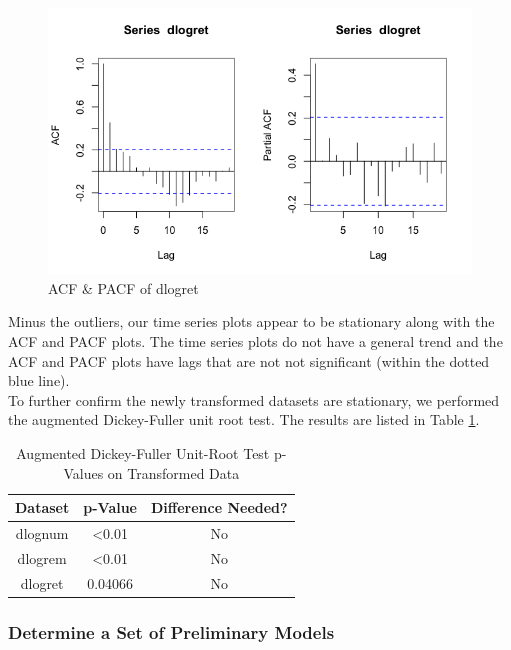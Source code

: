 \documentclass[a4paper]{article}
\begin{document}
\begin{figure}[h!]
\centering
\includegraphics[scale=0.4]{images/acf_pacf_dlogret.png}
\caption{ACF \& PACF of dlogret}
\label{fig:acf_pacf_dlogret}
\end{figure}

Minus the outliers, our time series plots appear to be stationary along with the ACF and PACF plots. The time series plots do not have a general trend and the ACF and PACF plots have lags that are not not significant (within the dotted blue line).\\

To further confirm the newly transformed datasets are stationary, we performed the augmented Dickey-Fuller unit root test. The results are listed in Table \ref{tab:dickey2}.

\begin{table}[h!]
    \centering
    \caption{Augmented Dickey-Fuller Unit-Root Test p-Values on Transformed Data}
    \begin{tabular}{|c|c|c|}
    \hline
    Dataset & p-Value & Difference Needed? \\
    \hline
    dlognum & <0.01 & No \\ 
    \hline
    dlogrem & <0.01 & No \\
    \hline
    dlogret & 0.04066 & No \\ 
    \hline
    \end{tabular}
    \label{tab:dickey2}
\end{table}

\subsubsection{Determine a Set of Preliminary Models}
\end{document}
